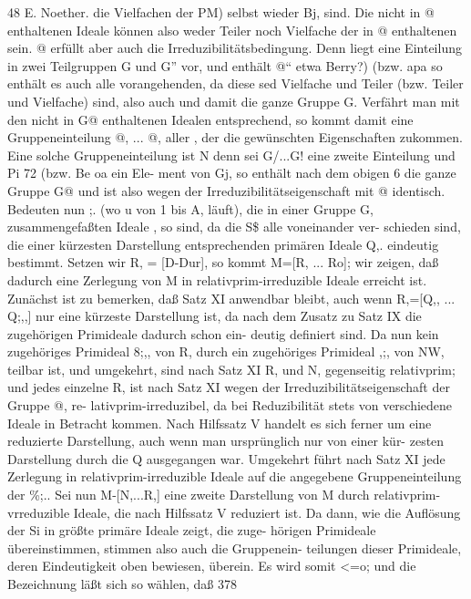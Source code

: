 \documentclass[11pt,a4paper]{article}
\theoremstyle{plain}
\theoremstyle{definition}
\begin{document}
48 
E. Noether. 
die Vielfachen der 
PM) selbst wieder 
Bj, sind. 
Die nicht in 
@ enthaltenen Ideale können 
also weder Teiler noch Vielfache der in @ 
enthaltenen sein. @ erfüllt aber auch die Irreduzibilitätsbedingung. 
Denn 
liegt eine Einteilung in zwei Teilgruppen G und G'' vor, und enthält @`` 
etwa Berry?) (bzw. apa so 
enthält 
es auch alle vorangehenden, 
da diese sed Vielfache und Teiler (bzw. Teiler und Vielfache) 
sind, also auch  und damit die ganze Gruppe G. 
Verfährt man mit 
den nicht in G@ enthaltenen Idealen entsprechend, 
so kommt damit eine 
Gruppeneinteilung @, ... @, aller , der die gewünschten Eigenschaften 
zukommen. 
Eine 
solche 
Gruppeneinteilung 
ist N 
denn 
sei 
G/...G! 
eine zweite Einteilung und Pi 72 (bzw. Be oa ein Ele- 
ment von Gj, so enthält nach dem obigen 6 die ganze Gruppe G@ und 
ist also wegen der Irreduzibilitätseigenschaft mit @ identisch. 
Bedeuten nun ;. (wo u von 1 bis A, läuft), die in einer Gruppe G, 
zusammengefaßten 
Ideale , so 
sind, da die S\$ alle voneinander ver- 
schieden sind, die einer kürzesten Darstellung entsprechenden 
primären 
Ideale Q,. eindeutig bestimmt. 
Setzen wir 
R, = [D-Dur], 
so kommt M=[R, 
... Ro]; 
wir zeigen, daß dadurch eine Zerlegung von M in relativprim-irreduzible 
Ideale erreicht ist. Zunächst ist zu bemerken, daß Satz XI anwendbar bleibt, 
auch wenn R,=[Q,, ... Q;,,] nur eine kürzeste Darstellung ist, da nach 
dem Zusatz zu Satz IX die zugehörigen Primideale dadurch schon ein- 
deutig definiert sind. Da nun kein zugehöriges Primideal 8;,, von R, durch 
ein zugehöriges Primideal 
,;, von NW, teilbar ist, und umgekehrt, 
sind 
nach Satz XI R, und N, gegenseitig relativprim; 
und jedes einzelne R, 
ist nach Satz XI wegen der Irreduzibilitätseigenschaft der Gruppe @, re- 
lativprim-irreduzibel, da bei Reduzibilität stets von  verschiedene Ideale 
in Betracht kommen. 
Nach Hilfssatz V handelt 
es sich ferner um eine 
reduzierte Darstellung, 
auch wenn man ursprünglich nur von einer kür- 
zesten Darstellung durch die Q ausgegangen war. 
Umgekehrt führt nach 
Satz XI jede Zerlegung in relativprim-irreduzible Ideale auf die angegebene 
Gruppeneinteilung der \%;.. 
Sei nun M-[N,...R,] 
eine zweite Darstellung 
von M durch 
relativprim-vrreduzible 
Ideale, 
die nach Hilfssatz V reduziert 
ist. 
Da 
dann, wie die Auflösung der Si in größte primäre Ideale zeigt, die zuge- 
hörigen Primideale übereinstimmen, 
stimmen 
also auch 
die Gruppenein- 
teilungen dieser Primideale, deren Eindeutigkeit 
oben bewiesen, überein. 
Es wird somit <=o; 
und 
die Bezeichnung 
läßt 
sich 
so wählen, 
daß 
378
\end{document}
